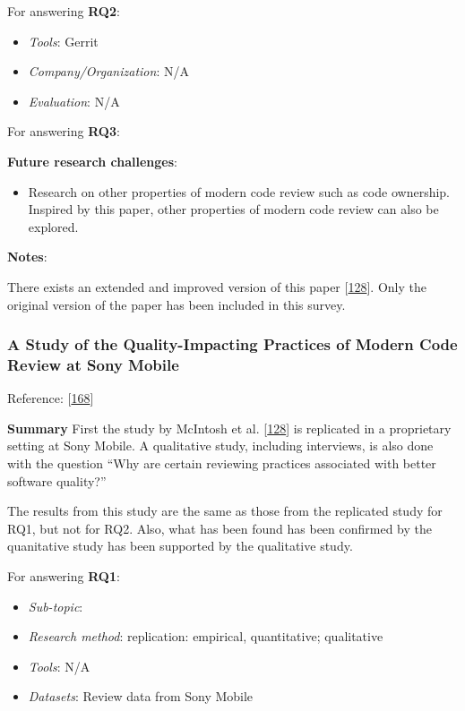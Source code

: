 \documentclass[]{book}
\providecommand{\tightlist}{%
  \setlength{\itemsep}{0pt}\setlength{\parskip}{0pt}}
\begin{document}
For answering \textbf{RQ2}:

\begin{itemize}
\tightlist
\item
  \emph{Tools}: Gerrit
\item
  \emph{Company/Organization}: N/A
\item
  \emph{Evaluation}: N/A
\end{itemize}

For answering \textbf{RQ3}:

\textbf{Future research challenges}:

\begin{itemize}
\tightlist
\item
  Research on other properties of modern code review such as code
  ownership. Inspired by this paper, other properties of modern code
  review can also be explored.
\end{itemize}

\textbf{Notes}:

There exists an extended and improved version of this paper
{[}\protect\hyperlink{ref-mcintosh2016empirical}{128}{]}. Only the
original version of the paper has been included in this survey.

\subsubsection{A Study of the Quality-Impacting Practices of Modern Code
Review at Sony
Mobile}\label{a-study-of-the-quality-impacting-practices-of-modern-code-review-at-sony-mobile}

Reference: {[}\protect\hyperlink{ref-shimagaki2016study}{168}{]}

\textbf{Summary} First the study by McIntosh et al.
{[}\protect\hyperlink{ref-mcintosh2016empirical}{128}{]} is replicated
in a proprietary setting at Sony Mobile. A qualitative study, including
interviews, is also done with the question ``Why are certain reviewing
practices associated with better software quality?''

The results from this study are the same as those from the replicated
study for RQ1, but not for RQ2. Also, what has been found has been
confirmed by the quanitative study has been supported by the qualitative
study.

For answering \textbf{RQ1}:

\begin{itemize}
\tightlist
\item
  \emph{Sub-topic}:
\item
  \emph{Research method}: replication: empirical, quantitative;
  qualitative
\item
  \emph{Tools}: N/A
\item
  \emph{Datasets}: Review data from Sony Mobile
\end{itemize}
\end{document}
